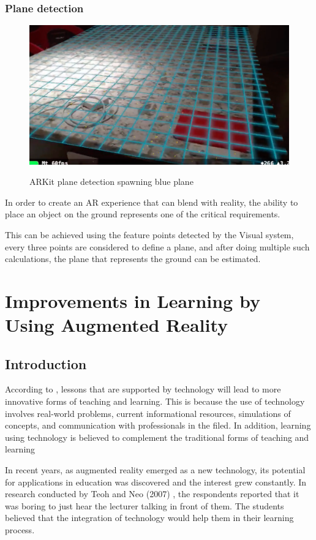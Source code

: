 \documentclass[12 pct]{report}
\begin{document}
\subsection*{Plane detection}
\begin{figure}[H]
\includegraphics[width=1\textwidth]{plane-detection}
\centering
\label{fig:plane-detection}
\caption{ARKit plane detection spawning blue plane}
\end{figure}

In order to create an AR experience that can blend with reality, the ability to place an object on the ground represents one of the critical requirements. 

This can be achieved using the feature points detected by the Visual system, every three points are considered to define a plane, and after doing multiple such calculations, the plane that represents the ground can be estimated.

\chapter{Improvements in Learning by Using Augmented Reality}
\section{Introduction}
According to \cite{shapley2011effects}, lessons that are supported by technology will lead to more innovative forms of teaching and learning. This is because the use of technology involves real-world problems, current informational resources, simulations of concepts, and communication with professionals in the filed. In addition, learning using technology is believed to complement the traditional forms of teaching and learning \cite{saidinar}

In recent years, as augmented reality emerged as a new technology, its potential for applications in education was discovered and the interest grew constantly. In research conducted by Teoh and Neo (2007) \cite{teoh2007interactive}, the respondents reported that it was boring to just hear the lecturer talking in front of them. The students believed that the integration of technology would help them in their learning process. 
\end{document}
